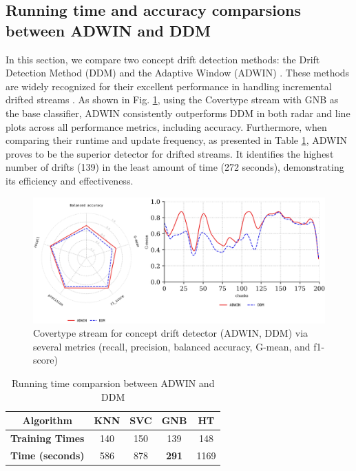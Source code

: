     \subsection{Running time and accuracy comparsions between ADWIN and DDM}
    In this section, we compare two concept drift detection methods: the Drift Detection Method (DDM) \cite{gama2004learning} and the Adaptive Window (ADWIN) \cite{gama2004learning}\cite{adams2023explainable}. These methods are widely recognized for their excellent performance in handling incremental drifted streams \cite{gama2004learning}\cite{adams2023explainable}\cite{madkour2023historical}\cite{baena2006early}. As shown in Fig. \ref{fig:5_result5}, using the Covertype stream with GNB as the base classifier, ADWIN consistently outperforms DDM in both radar and line plots across all performance metrics, including accuracy. Furthermore, when comparing their runtime and update frequency, as presented in Table \ref{table:5_4}, ADWIN proves to be the superior detector for drifted streams. It identifies the highest number of drifts (139) in the least amount of time (272 seconds), demonstrating its efficiency and effectiveness.

    \begin{figure}[!ht]
      \caption{Covertype stream for concept drift detector (ADWIN, DDM) via several metrics (recall, precision, balanced accuracy, G-mean, and f1-score)}
      \label{fig:5_result5}
      \centering
      \includegraphics[width=1\linewidth]{5_Emerging/figures/result5}
    \end{figure}
 
    \begin{table}[h!]
      \centering
      \caption{Running time comparsion between ADWIN and DDM}
      \label{table:5_4}
      \begin{tabular}{|c|c|c|c|c|}
       
      \hline
      \textbf{Algorithm} & \textbf{KNN} & \textbf{SVC} & \textbf{GNB} & \textbf{HT} \\ \hline
      \textbf{Training Times} & 140 & 150 & 139 & 148 \\ \hline
      \textbf{Time (seconds)} & 586 & 878 & \textbf{291} & 1169 \\ \hline
      \end{tabular}
      \end{table}